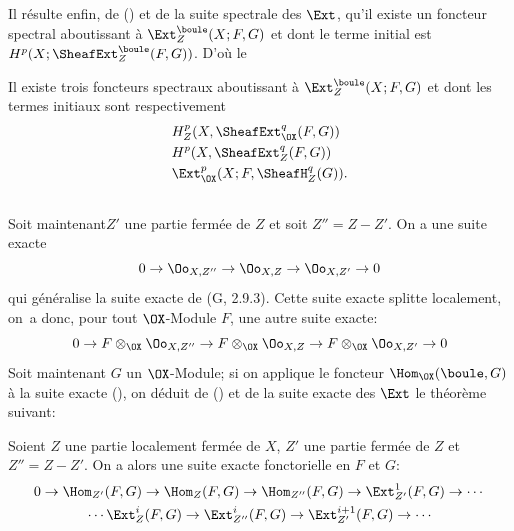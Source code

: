 Il r\'esulte enfin, de () et de la suite spectrale des $\Ext$, qu'il existe un foncteur spectral aboutissant \`a $\Ext^{\boule}_Z(X;F, G)$ et dont le terme initial est $H^p(X;\SheafExt_Z^\boule(F, G))$. D'o\`u le

\setcounter{equation}{0}

\begin{theoreme} \label{VI.1.6}
Il existe trois foncteurs spectraux aboutissant \`a $\Ext_{Z}^\boule(X;F, G)$ et dont les termes initiaux sont respectivement
\begin{align}
\label{VI.1.6.1} &H_Z^p(X, \SheafExt_{\OX}^q(F, G))\\
\label{VI.1.6.2} &H^p(X, \SheafExt_Z^q(F, G))\\
\label{VI.1.6.3} &\Ext_{\OX}^p(X;F, \SheafH_Z^q(G)).
\end{align}
\end{theoreme}

\subsection{} \label{VI.1.7}
Soit maintenant\pageoriginale $Z'$ une partie ferm\'ee de $Z$ et soit $Z''=Z {-} Z'$. On a une suite exacte
\setcounter{equation}{0}
\begin{equation} \label{VI.1.7.1}
0 \to \Oo_{X, Z''} \to \Oo_{X, Z} \to \Oo_{X, Z'} \to 0
\end{equation}
qui g\'en\'eralise la suite exacte de (G, 2.9.3). Cette suite exacte splitte localement, on~a donc, pour tout $\OX$-Module $F$, une autre suite exacte:
\begin{equation} \label{VI.1.7.2} {0 \to F \otimes_{\OX} \Oo_{X, Z''} \to F \otimes_{\OX} \Oo_{X, Z} \to F \otimes_{\OX} \Oo_{X, Z'} \to 0}
\end{equation}
Soit maintenant $G$ un $\OX$-Module; si on applique le foncteur $\Hom_{\OX}(\boule, G)$ \`a la suite exacte (), on d\'eduit de () et de la suite exacte des $\Ext$ le th\'eor\`eme suivant:

\begin{theoreme} \label{VI.1.8}
Soient $Z$ une partie localement ferm\'ee de $X$, $Z'$ une partie ferm\'ee de $Z$ et $Z''=Z{-} Z'$. On a alors une suite exacte fonctorielle en $F$ et $G$:
\begin{gather*}
0 \to \Hom_{Z'}(F, G) \to \Hom_Z(F, G) \to \Hom_{Z''}(F, G)\to \Ext_{{Z'}}^1(F, G) \to \cdots{}\\
{}\cdots \Ext_{Z}^i(F, G) \to \Ext_{{Z''}}^i(F, G) \to \Ext_{{Z'}}^{i+1}(F, G) \to \cdots{}
\end{gather*}
\end{theoreme}

